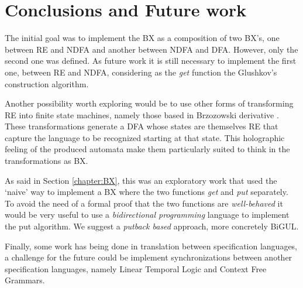 \section{Conclusions and Future work}
The initial goal was to implement the BX as a composition of two BX's, one between RE and NDFA and another between NDFA and DFA. However, only the second one was defined. As future work it is still necessary to implement the first one, between RE and NDFA, considering as the \textit{get} function the Glushkov's construction algorithm. 

Another possibility worth exploring would be to use other forms of transforming RE into finite state machines, namely those based in Brzozowski derivative \cite{Brzozowski64derivativesof}. These transformations generate a DFA whose states are themselves RE that capture the language to be recognized starting at that state. 
This holographic feeling of the produced automata make them particularly suited to think in the transformations as BX.

As said in Section \ref{chapter:BX}, this was an exploratory work that used the `naive' way to implement a BX where the two functions \textit{get} and \textit{put} separately. To avoid the need of a formal proof that the two functions are \textit{well-behaved} it would be very useful to use a \textit{bidirectional programming} language to implement the put algorithm. We suggest a \textit{putback based} approach, more concretely BiGUL.

Finally, some work has being done in translation between specification languages, a challenge for the future could be implement synchronizations between another specification languages, namely Linear Temporal Logic and Context Free Grammars.